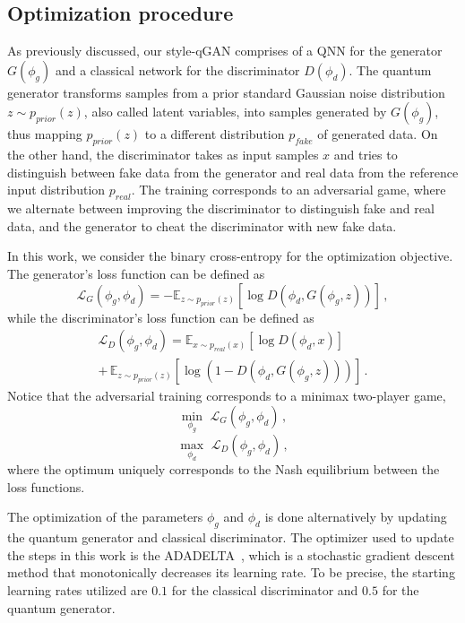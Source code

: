 \documentclass[twocolumn,preprintnumbers,superscriptaddress]{revtex4-2}
\begin{document}
\subsection{Optimization procedure}

As previously discussed, our style-qGAN comprises of a QNN for the generator $G(\phi_g)$ and a classical network for the discriminator $D(\phi_d)$. The quantum generator transforms samples from a prior standard Gaussian noise distribution $z \sim p_{prior}(z)$, also called latent variables, into samples generated by $G(\phi_g)$, thus mapping $p_{prior}(z)$ to a different distribution $p_{fake}$ of generated data. On the other hand, the discriminator takes as input samples $x$ and tries to distinguish between fake data from the generator and real data from the reference input distribution $p_{real}$. The training corresponds to an adversarial game, where we alternate between improving the discriminator to distinguish fake and real data, and the generator to cheat the discriminator with new fake data.

In this work, we consider the binary cross-entropy for the optimization objective. The generator's loss function can be defined as
\begin{equation}
  \mathcal{L}_G(\phi_g,\phi_d) = -\mathbb{E}_{z \sim p_{prior}(z)}[\log D(\phi_d,G(\phi_g,z))]  \,,
\end{equation}
while the discriminator's loss function can be defined as
\begin{equation}
\begin{split}
  \mathcal{L}_D(\phi_g,\phi_d) = \mathbb{E}_{x \sim p_{real}(x)}[\log D(\phi_d,x)] \\+\, \mathbb{E}_{z \sim p_{prior}(z)}[\log (1-D(\phi_d,G(\phi_g,z)))]\,.
\end{split}
\end{equation}
Notice that the adversarial training corresponds to a minimax two-player game,
\begin{equation}
 \underset{\phi_g}{\min}\,\,\mathcal{L}_G(\phi_g,\phi_d)  \,,
\end{equation}
\begin{equation}
 \underset{\phi_d}{\max}\,\,\mathcal{L}_D(\phi_g,\phi_d)  \,,
\end{equation}
where the optimum uniquely corresponds to the Nash equilibrium between the loss functions.

The optimization of the parameters $\phi_g$ and $\phi_d$ is done alternatively by updating the quantum generator and classical discriminator. The optimizer used to update the steps in this work is the ADADELTA~\cite{zeiler2012adadelta}, which is a stochastic gradient descent method that monotonically decreases its learning rate. To be precise, the starting learning rates utilized are $0.1$ for the classical discriminator and $0.5$ for the quantum generator.
\end{document}

